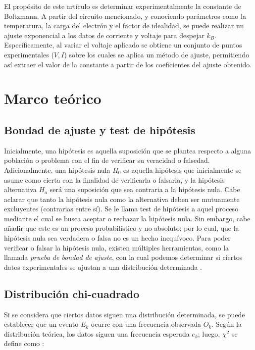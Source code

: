 \documentclass[twocolumn]{article} %
\begin{document}
El propósito de este artículo es determinar experimentalmente la constante de Boltzmann. A partir del circuito mencionado, y conociendo parámetros como la temperatura, la carga del electrón y el factor de idealidad, se puede realizar un ajuste exponencial a los datos de corriente y voltaje para despejar $k_B$. Específicamente, al variar el voltaje aplicado se obtiene un conjunto de puntos experimentales ($V, I$) sobre los cuales se aplica un método de ajuste, permitiendo así extraer el valor de la constante a partir de los coeficientes del ajuste obtenido.


\section{Marco teórico}
\subsection{Bondad de ajuste y test de hipótesis}

Inicialmente, una hipótesis es aquella suposición que se plantea respecto a alguna población o problema con el fin de verificar su veracidad o falsedad. Adicionalmente, una hipótesis nula $H_0$ es aquella hipótesis que inicialmente se asume como cierta con la finalidad de verificarla o falsarla, y la hipótesis alternativa $H_a$ será una suposición que sea contraria a la hipótesis nula. Cabe aclarar que tanto la hipótesis nula como la alternativa deben ser mutuamente excluyentes (contrarias entre sí). Se le llama test de hipótesis a aquel proceso mediante el cual se busca aceptar o rechazar la hipótesis nula. Sin embargo, cabe añadir que este es un proceso probabilístico y no absoluto; por lo cual, que la hipótesis nula sea verdadera o falsa no es un hecho inequívoco. Para poder verificar o falsar la hipótesis nula, existen múltiples herramientas, como la llamada \textit{prueba de bondad de ajuste}, con la cual podemos determinar si ciertos datos experimentales se ajustan a una distribución determinada \cite{marques1991probabilidad}.
\subsection{Distribución chi-cuadrado}

Si se considera que ciertos datos siguen una distribución determinada, se puede establecer que un evento $E_k$ ocurre con una frecuencia observada $O_k$. Según la distribución teórica, los datos siguen una frecuencia esperada $e_k$; luego, $\chi^2$ se define como \cite{marques1991probabilidad}:
\end{document}
